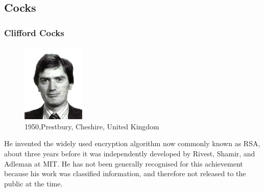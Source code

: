 \documentclass[slidestop,compress,mathserif]{beamer}
\begin{document}
\subsection{\hfill Cocks}
\begin{frame}
  \frametitle{Clifford Cocks}
  
  \begin{multicols}{2}
    \begin{figure}
      \includegraphics[width=3cm]{Cocks.jpg}
      \caption{1950,Prestbury, Cheshire, United Kingdom}
    \end{figure}
    \small

    He invented the widely used encryption algorithm now commonly known as RSA, about three years before it was independently developed by Rivest, Shamir, and Adleman at MIT. He has not been generally recognised for this achievement because his work was classified information, and therefore not released to the public at the time.

    
  \end{multicols}
  
\end{frame}
\end{document}
